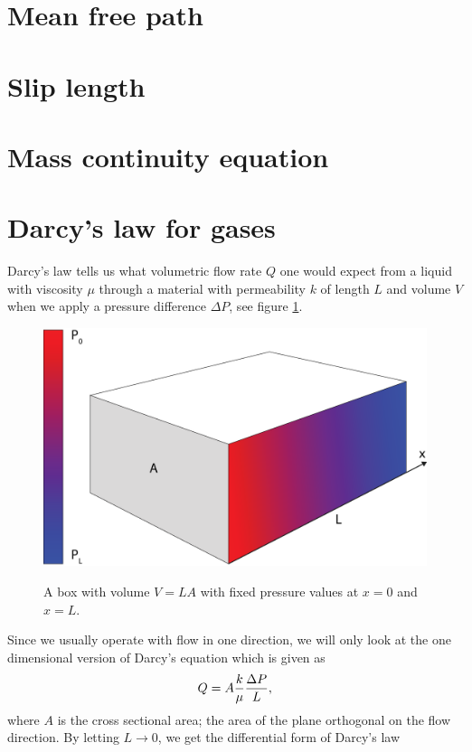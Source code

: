 \section{Mean free path}
\section{Slip length}
\section{Mass continuity equation}

\section{Darcy's law for gases}
\label{sec:darcy_gas}
Darcy's law tells us what volumetric flow rate $Q$ one would expect from a liquid with viscosity $\mu$ through a material with permeability $k$ of length $L$ and volume $V$ when we apply a pressure difference $\Delta P$, see figure \ref{fig:darcys_law}. 
\begin{figure}[h]
\begin{center}
\includegraphics[width=\textwidth, trim=0cm 0cm 0cm 0cm, clip]{kinetic_theory/figures/darcy.eps}
\label{fig:darcys_law}
\end{center}
\caption{A box with volume $V=LA$ with fixed pressure values at $x=0$ and $x=L$.}
\end{figure}
Since we usually operate with flow in one direction, we will only look at the one dimensional version of Darcy's equation which is given as
\begin{align}
\label{eq:darcy_1}
	Q = A{k\over \mu}{\Delta P\over L},
\end{align}
where $A$ is the cross sectional area; the area of the plane orthogonal on the flow direction. By letting $L\rightarrow 0$, we get the differential form of Darcy's law
